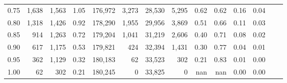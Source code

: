 \begin{tabular}{rrrrrrrrrrrrrr}
0.75 &   1,638 &  1,563 &    1.05 &  176,972 &    3,273 &  28,530 &   5,295 &  0.62 &  0.62 &  0.16 &      0.04 \\
0.80 &   1,318 &  1,426 &    0.92 &  178,290 &    1,955 &  29,956 &   3,869 &  0.51 &  0.66 &  0.11 &      0.03 \\
0.85 &     914 &  1,263 &    0.72 &  179,204 &    1,041 &  31,219 &   2,606 &  0.40 &  0.71 &  0.08 &      0.02 \\
0.90 &     617 &  1,175 &    0.53 &  179,821 &      424 &  32,394 &   1,431 &  0.30 &  0.77 &  0.04 &      0.01 \\
0.95 &     362 &  1,129 &    0.32 &  180,183 &       62 &  33,523 &     302 &  0.21 &  0.83 &  0.01 &      0.00 \\
1.00 &      62 &    302 &    0.21 &  180,245 &        0 &  33,825 &       0 &   nan &   nan &  0.00 &      0.00 \\
\bottomrule
\end{tabular}
